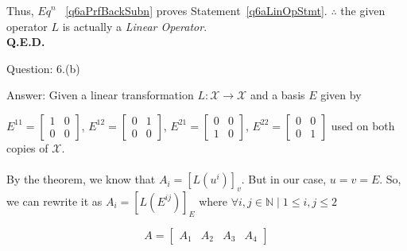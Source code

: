 \documentclass[a4paper]{article}
\begin{document}
\begin{qalist}
		Thus, ${Eq}^{n}$ ~\ref{q6aPrfBackSubn} proves Statement~\ref{q6aLinOpStmt}. $\therefore$ the given operator $L$ is actually a \textit{Linear Operator}. \\ \textbf{Q.E.D.}
		
		\newpage
		\item[Question: 6.(b)] \setcounter{equation}{0}
		\item[Answer:] Given a linear transformation $L : \mathcal{X} \rightarrow \mathcal{X}$ and a basis $E$ given by 
		
		${E}^{11} = \begin{bmatrix}1 & 0 \\ 0 & 0 \end{bmatrix}$, ${E}^{12} = \begin{bmatrix}0 & 1 \\ 0 & 0 \end{bmatrix}$, ${E}^{21} = \begin{bmatrix}0 & 0 \\ 1 & 0 \end{bmatrix}$, ${E}^{22} = \begin{bmatrix}0 & 0 \\ 0 & 1 \end{bmatrix}$ used on both copies of $\mathcal{X}$.
%		
		\\ \\ By the theorem, we know that ${A}_{i} = {[L({u}^{i})]}_{v}$. But in our case, $u = v = E$. So, we can rewrite it as ${A}_{i} = {[L({E}^{ij})]}_{E}$ where $\forall i,j\in \mathbb{N} \; | \; 1 \leq i,j \leq 2$
		
		\begin{equation}
			A = \begin{bmatrix} {A}_{1} &  {A}_{2} &  {A}_{3} &  {A}_{4} \end{bmatrix}
		\end{equation}
		

\end{qalist}
\end{document}
